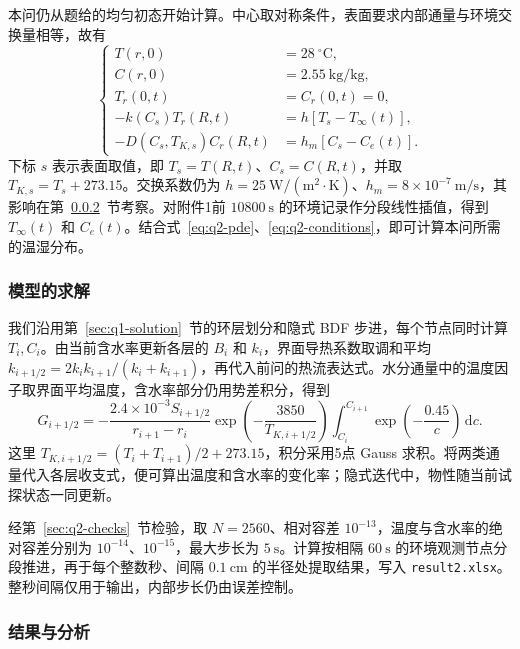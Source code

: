 \documentclass[UTF8,a4paper]{ctexart}
\begin{document}
本问仍从题给的均匀初态开始计算。中心取对称条件，表面要求内部通量与环境交换量相等，故有
\begin{equation}
\left\{
\begin{aligned}
T(r,0)&=28~^\circ\mathrm C,\\
C(r,0)&=2.55~\mathrm{kg/kg},\\
T_r(0,t)&=C_r(0,t)=0,\\
-k(C_s)T_r(R,t)&=h[T_s-T_\infty(t)],\\
-D(C_s,T_{K,s})C_r(R,t)&=h_m[C_s-C_e(t)].
\end{aligned}
\right.
\label{eq:q2-conditions}
\end{equation}
下标 \(s\) 表示表面取值，即 \(T_s=T(R,t)\)、\(C_s=C(R,t)\)，并取 \(T_{K,s}=T_s+273.15\)。交换系数仍为 \(h=25~\mathrm{W/(m^2\cdot K)}\)、\(h_m=8\times10^{-7}~\mathrm{m/s}\)，其影响在第~\ref{sec:q2-results}~节考察。对附件1前 \(10800~\mathrm s\) 的环境记录作分段线性插值，得到 \(T_\infty(t)\) 和 \(C_e(t)\)。结合式~\eqref{eq:q2-pde}、\eqref{eq:q2-conditions}，即可计算本问所需的温湿分布。

\subsubsection{模型的求解}
\label{sec:q2-solution}

我们沿用第~\ref{sec:q1-solution}~节的环层划分和隐式 BDF 步进，每个节点同时计算 \(T_i,C_i\)。由当前含水率更新各层的 \(B_i\) 和 \(k_i\)，界面导热系数取调和平均 \(k_{i+1/2}=2k_i k_{i+1}/(k_i+k_{i+1})\)，再代入前问的热流表达式。水分通量中的温度因子取界面平均温度，含水率部分仍用势差积分，得到
\begin{equation}
G_{i+1/2}
 =-\frac{2.4\times10^{-3}S_{i+1/2}}{r_{i+1}-r_i}
   \exp\!\left(-\frac{3850}{T_{K,i+1/2}}\right)
   \int_{C_i}^{C_{i+1}}\exp\!\left(-\frac{0.45}{c}\right)\,\mathrm dc.
\label{eq:q2-moisture-flux}
\end{equation}
这里 \(T_{K,i+1/2}=(T_i+T_{i+1})/2+273.15\)，积分采用5点 Gauss 求积。将两类通量代入各层收支式，便可算出温度和含水率的变化率；隐式迭代中，物性随当前试探状态一同更新。

经第~\ref{sec:q2-checks}~节检验，取 \(N=2560\)、相对容差 \(10^{-13}\)，温度与含水率的绝对容差分别为 \(10^{-14}\)、\(10^{-15}\)，最大步长为 \(5~\mathrm s\)。计算按相隔 \(60~\mathrm s\) 的环境观测节点分段推进，再于每个整数秒、间隔 \(0.1~\mathrm{cm}\) 的半径处提取结果，写入 \texttt{result2.xlsx}。整秒间隔仅用于输出，内部步长仍由误差控制。

\subsubsection{结果与分析}
\label{sec:q2-results}
\end{document}
